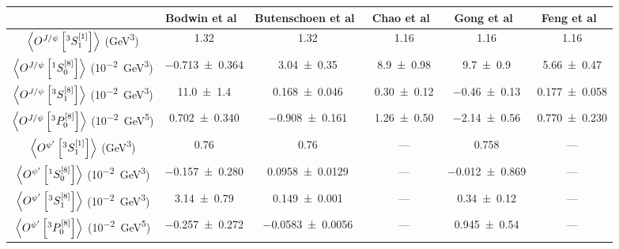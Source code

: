 {
\renewcommand{\arraystretch}{1.5}
\begin{tabular}{c|ccccc}
	\hline
	                                                                                 & Bodwin et al~\cite{bodwin2016} & Butenschoen et al~\cite{butenschoen2011,butenschoen2023} & Chao et al~\cite{chao2012} & Gong et al~\cite{gong2013} & Feng et al~\cite{feng2019} \\ \hline
	$\expval{ O^{J/\psi}\left[^3S_1^{\left[1\right]}\right]}$ (\unit{\GeV^3})        & \num{1.32}                     & \num{1.32}                                               & \num{1.16}                 & \num{1.16}                 & \num{1.16}                 \\ \hline
	$\expval{ O^{J/\psi}\left[^1S_0^{\left[8\right]}\right]}$ (\unit{10^{-2}\GeV^3}) & \num{-0.713\pm0.364}           & \num{3.04\pm0.35}                                        & \num{8.9\pm0.98}           & \num{9.7\pm0.9}            & \num{5.66\pm0.47}          \\ \hline
	$\expval{ O^{J/\psi}\left[^3S_1^{\left[8\right]}\right]}$ (\unit{10^{-2}\GeV^3}) & \num{11.0\pm1.4}               & \num{0.168\pm0.046}                                      & \num{0.30\pm0.12}          & \num{-0.46\pm0.13}         & \num{0.177\pm0.058}        \\ \hline
	$\expval{ O^{J/\psi}\left[^3P_0^{\left[8\right]}\right]}$ (\unit{10^{-2}\GeV^5}) & \num{0.702\pm0.340}            & \num{-0.908\pm0.161}                                     & \num{1.26\pm0.50}          & \num{-2.14\pm0.56}         & \num{0.770\pm0.230}        \\ \hline \hline
	$\expval{ O^{\psi'}\left[^3S_1^{\left[1\right]}\right]}$ (\unit{\GeV^3})         & \num{0.76}                     & \num{0.76}                                               & ---                        & \num{0.758}                & ---                        \\ \hline
	$\expval{ O^{\psi'}\left[^1S_0^{\left[8\right]}\right]}$ (\unit{10^{-2}\GeV^3})  & \num{-0.157\pm0.280}           & \num{0.0958\pm0.0129}                                    & ---                        & \num{-0.012\pm0.869}       & ---                        \\ \hline
	$\expval{ O^{\psi'}\left[^3S_1^{\left[8\right]}\right]}$ (\unit{10^{-2}\GeV^3})  & \num{3.14\pm0.79}              & \num{0.149\pm0.001}                                      & ---                        & \num{0.34\pm0.12}          & ---                        \\ \hline
	$\expval{ O^{\psi'}\left[^3P_0^{\left[8\right]}\right]}$ (\unit{10^{-2}\GeV^5})  & \num{-0.257\pm0.272}           & \num{-0.0583\pm0.0056}                                   & ---                        & \num{0.945\pm0.54}         & ---                        \\ \hline
\end{tabular}
}
